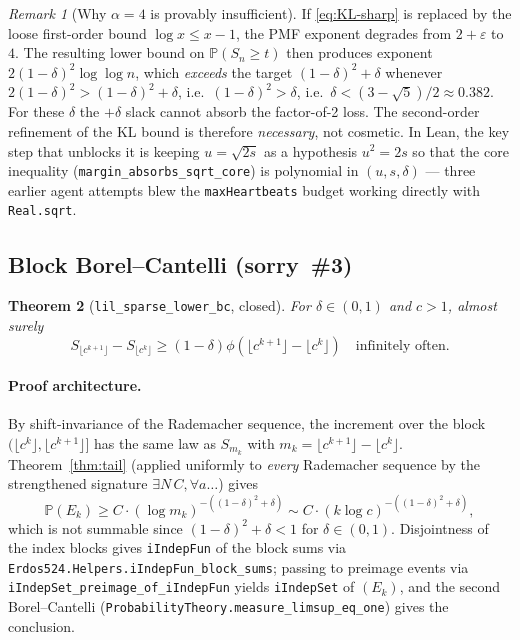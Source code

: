 \documentclass[11pt]{article}
\theoremstyle{plain}
\newtheorem{theorem}{Theorem}
\theoremstyle{definition}
\theoremstyle{remark}
\newtheorem{remark}[theorem]{Remark}
\newcommand{\PP}{\mathbb{P}}
\newcommand{\eps}{\varepsilon}
\begin{document}
\begin{remark}[Why $\alpha=4$ is provably insufficient]\label{rem:alpha4}
If \eqref{eq:KL-sharp} is replaced by the loose first-order bound
$\log x \le x-1$, the PMF exponent degrades from $2 + \eps$ to $4$. The
resulting lower bound on $\PP(S_n\ge t)$ then produces exponent
$2(1-\delta)^2\log\log n$, which \emph{exceeds} the target
$(1-\delta)^2+\delta$ whenever $2(1-\delta)^2 > (1-\delta)^2+\delta$,
i.e.\ $(1-\delta)^2 > \delta$, i.e.\ $\delta < (3-\sqrt 5)/2 \approx
0.382$. For these $\delta$ the $+\delta$ slack cannot absorb the
factor-of-2 loss. The second-order refinement of the KL bound is
therefore \emph{necessary}, not cosmetic. In Lean, the key step that
unblocks it is keeping $u = \sqrt{2s}$ as a hypothesis $u^2 = 2s$ so that
the core inequality (\texttt{margin\_absorbs\_sqrt\_core}) is polynomial
in $(u,s,\delta)$ — three earlier agent attempts blew the
\texttt{maxHeartbeats} budget working directly with \texttt{Real.sqrt}.
\end{remark}

\subsection{Block Borel–Cantelli (sorry~\#3)}

\begin{theorem}[\texttt{lil\_sparse\_lower\_bc}, closed]
For $\delta \in (0,1)$ and $c > 1$, almost surely
\[
  S_{\lfloor c^{k+1}\rfloor} - S_{\lfloor c^k\rfloor}
    \ge (1-\delta)\phi(\lfloor c^{k+1}\rfloor - \lfloor c^k\rfloor)
  \quad\text{infinitely often.}
\]
\end{theorem}

\paragraph{Proof architecture.} By shift-invariance of the Rademacher
sequence, the increment over the block $(\lfloor c^k\rfloor,
\lfloor c^{k+1}\rfloor]$ has the same law as $S_{m_k}$ with
$m_k = \lfloor c^{k+1}\rfloor - \lfloor c^k\rfloor$. Theorem~\ref{thm:tail}
(applied uniformly to \emph{every} Rademacher sequence by the strengthened
signature $\exists N\,C,\forall a\ldots$) gives
\[
  \PP(E_k) \ge C\cdot (\log m_k)^{-((1-\delta)^2+\delta)}
  \sim C\cdot (k\log c)^{-((1-\delta)^2+\delta)},
\]
which is not summable since $(1-\delta)^2 + \delta < 1$ for
$\delta \in (0,1)$. Disjointness of the index blocks
gives \texttt{iIndepFun} of the block sums via
\texttt{Erdos524.Helpers.iIndepFun\_block\_sums}; passing to preimage
events via \texttt{iIndepSet\_preimage\_of\_iIndepFun} yields
\texttt{iIndepSet} of $(E_k)$, and the second Borel–Cantelli
(\texttt{ProbabilityTheory.measure\_limsup\_eq\_one}) gives the
conclusion.
\end{document}
